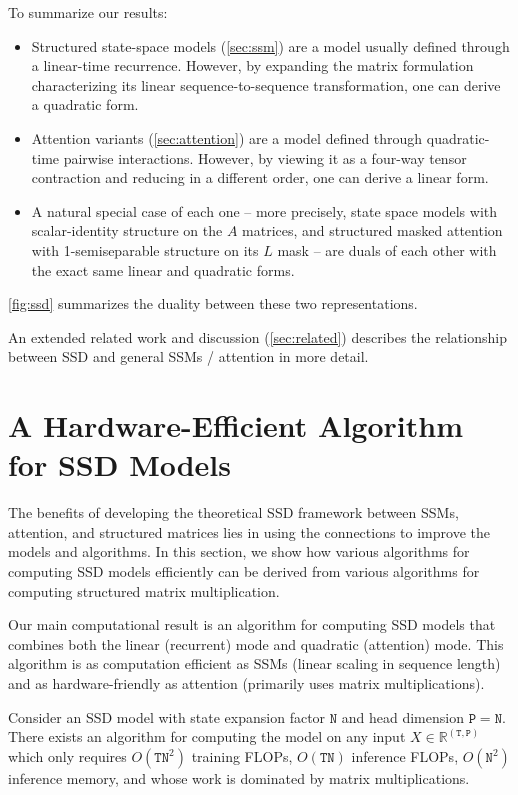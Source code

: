 To summarize our results:

\begin{itemize}
  \item Structured state-space models (\ref{sec:ssm}) are a model usually defined through a linear-time recurrence. However, by expanding the matrix formulation characterizing its linear sequence-to-sequence transformation, one can derive a quadratic form.
  \item Attention variants (\ref{sec:attention}) are a model defined through quadratic-time pairwise interactions. However, by viewing it as a four-way tensor contraction and reducing in a different order, one can derive a linear form.
  \item A natural special case of each one -- more precisely, state space models with scalar-identity structure on the $A$ matrices, and structured masked attention with 1-semiseparable structure on its $L$ mask -- are duals of each other with the exact same linear and quadratic forms.
\end{itemize}

\ref{fig:ssd} summarizes the duality between these two representations.

An extended related work and discussion (\ref{sec:related}) describes the relationship between SSD and general SSMs / attention in more detail.

\section{A Hardware-Efficient Algorithm for SSD Models}
\label{sec:efficient}

The benefits of developing the theoretical SSD framework between SSMs, attention, and structured matrices lies in using the connections to improve the models and algorithms. In this section, we show how various algorithms for computing SSD models efficiently can be derived from various algorithms for computing structured matrix multiplication.

Our main computational result is an algorithm for computing SSD models that combines both the linear (recurrent) mode and quadratic (attention) mode. This algorithm is as computation efficient as SSMs (linear scaling in sequence length) and as hardware-friendly as attention (primarily uses matrix multiplications).

\begin{theorem}
  \label{thm:algorithm}
  Consider an SSD model with state expansion factor $\mathtt{N}$ and head dimension $\mathtt{P}=\mathtt{N}$.
  There exists an algorithm for computing the model on any input $X \in \mathbb{R}^{\mathtt{(T, P)}}$ which only requires $O(\mathtt{TN}^2)$ training FLOPs, $O(\mathtt{TN})$ inference FLOPs,
  $O(\mathtt{N}^2)$ inference memory, and whose work is dominated by matrix multiplications.
\end{theorem}

